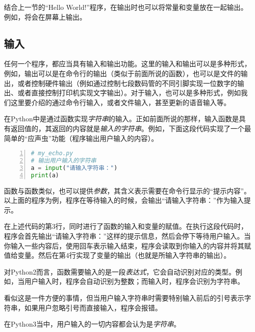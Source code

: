 结合上一节的“Hello World!”程序，在输出时也可以将常量和变量放在一起输出。例如，将会在屏幕上输出。

\subsection{输入}\label{subsec:输入与输出-input输入}

任何一个程序，都应当具有输入和输出功能。这里的输入和输出可以是多种形式，例如，输出可以是在命令行的输出（类似于前面所说的函数），也可以是文件的输出，或者控制硬件输出（例如通过控制七段数码管的不同引脚实现一位数字的输出、或者直接控制打印机实现文字输出）。对于输入，也可以是多种形式，例如我们这里要介绍的通过命令行输入，或者文件输入，甚至更新的语音输入等。

在Python中是通过函数实现\emph{字符串}的输入。正如前面所说的那样，输入函数是具有返回值的，其返回的内容就是\emph{输入的字符串}。例如，下面这段代码实现了一个最简单的“应声虫”功能（程序输出用户输入的内容）。

\begin{lstlisting}[language=python,caption={my\_echo.py},numbers=left]
# my_echo.py
# 输出用户输入的字符串
a = input("请输入字符串：")
print(a)
\end{lstlisting}

\begin{attention}
    函数与函数类似，也可以提供\emph{参数}，其含义表示需要在命令行显示的“提示内容”。以上面的程序为例，程序在等待输入的时候，会输出“请输入字符串：”作为输入提示。
\end{attention}

在上述代码的第3行，同时进行了函数的输入和变量的赋值。在执行这段代码时，程序会首先输出“请输入字符串：”这样的提示信息，然后会停下等待用户输入。当你输入一些内容后，使用回车表示输入结束，程序会读取到你输入的内容并将其赋值给变量。然后在第4行实现了变量的输出（也就是所输入字符串的输出）。

\begin{extend}
    对Python2而言，函数需要输入的是一段\emph{表达式}，它会自动识别对应的类型。例如，当用户输入时，程序会自动识别为整数；而输入时，程序会识别为字符串。

    看似这是一件方便的事情，但当用户输入字符串时需要特别输入前后的引号表示字符串，如果用户忽略引号而直接输入，程序会报错。

    在Python3当中，用户输入的一切内容都会认为是\emph{字符串}。
\end{extend}

